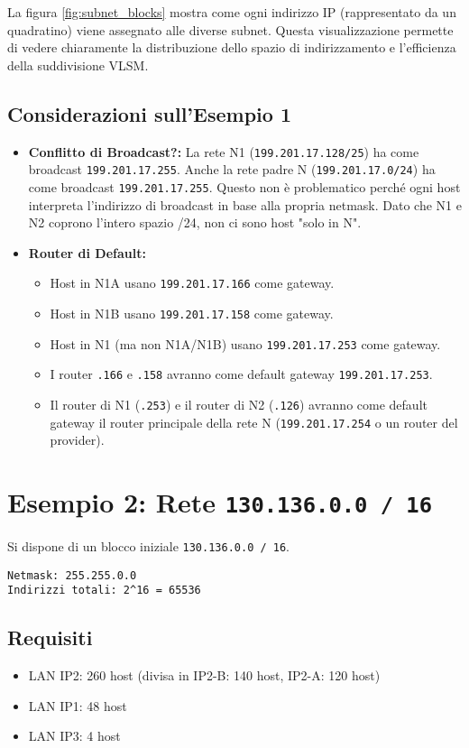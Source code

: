 La figura \ref{fig:subnet_blocks} mostra come ogni indirizzo IP (rappresentato da un quadratino) viene assegnato alle diverse subnet. Questa visualizzazione permette di vedere chiaramente la distribuzione dello spazio di indirizzamento e l'efficienza della suddivisione VLSM.

\subsection{Considerazioni sull'Esempio 1}
\begin{itemize}
    \item \textbf{Conflitto di Broadcast?:} La rete N1 (\texttt{199.201.17.128/25}) ha come broadcast \texttt{199.201.17.255}. Anche la rete padre N (\texttt{199.201.17.0/24}) ha come broadcast \texttt{199.201.17.255}. Questo non è problematico perché ogni host interpreta l'indirizzo di broadcast in base alla propria netmask. Dato che N1 e N2 coprono l'intero spazio /24, non ci sono host "solo in N".
    \item \textbf{Router di Default:}
    \begin{itemize}
        \item Host in N1A usano \texttt{199.201.17.166} come gateway.
        \item Host in N1B usano \texttt{199.201.17.158} come gateway.
        \item Host in N1 (ma non N1A/N1B) usano \texttt{199.201.17.253} come gateway.
        \item I router \texttt{.166} e \texttt{.158} avranno come default gateway \texttt{199.201.17.253}.
        \item Il router di N1 (\texttt{.253}) e il router di N2 (\texttt{.126}) avranno come default gateway il router principale della rete N (\texttt{199.201.17.254} o un router del provider).
    \end{itemize}
\end{itemize}

\newpage
\section{Esempio 2: Rete \texttt{130.136.0.0 / 16}}
Si dispone di un blocco iniziale \texttt{130.136.0.0 / 16}.
\begin{verbatim}
Netmask: 255.255.0.0
Indirizzi totali: 2^16 = 65536
\end{verbatim}

\subsection{Requisiti}
\begin{itemize}
    \item LAN IP2: 260 host (divisa in IP2-B: 140 host, IP2-A: 120 host)
    \item LAN IP1: 48 host
    \item LAN IP3: 4 host
\end{itemize}

